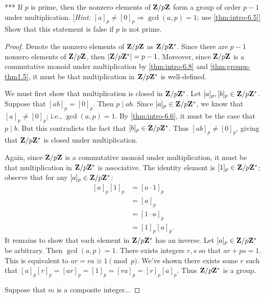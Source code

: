     \begin{exercise}{\color{red} ***}
        If $p$ is prime, then the nonzero elements of $\mathbf{Z}/p\mathbf{Z}$ form a group of order $p-1$ under multiplication. [\textit{Hint:} $[a]_{p} \neq [0]_p \Rightarrow \gcd(a,p) = 1$; use \ref{thm:intro-6.5}] Show that this statement is false if $p$ is not prime.
    \end{exercise}
        {\color{blue} \begin{proof}
            Denote the nonzero elements of $\mathbf{Z}/p\mathbf{Z}$ as $\mathbf{Z}/p\mathbf{Z}^\ast$. Since there are $p-1$ nonzero elements of $\mathbf{Z}/p\mathbf{Z}$, then $|\mathbf{Z}/p\mathbf{Z}^\ast| = p-1$. Moreover, since $\mathbf{Z}/p\mathbf{Z}$ is a commutative monoid under multiplication by \ref{thm:intro-6.8} and \ref{thm:groups-thm1.5}, it must be that multiplication in $\mathbf{Z}/p\mathbf{Z}^\ast$ is well-defined.

            We must first show that multiplication is closed in $\mathbf{Z}/p\mathbf{Z}^\ast$. Let $[a]_p,[b]_p \in \mathbf{Z}/p\mathbf{Z}^\ast$. Suppose that $[ab]_p = [0]_p$. Then $p \mid ab$. Since $[a]_p \in \mathbf{Z}/p\mathbf{Z}^\ast$, we know that $[a]_p \neq [0]_p$; i.e., $\gcd(a,p) = 1$. By \ref{thm:intro-6.6}, it must be the case that $p \mid b$. But this contradicts the fact that $[b]_p \in \mathbf{Z}/p\mathbf{Z}^\ast$. Thus $[ab]_p \neq [0]_p$, giving that $\mathbf{Z}/p\mathbf{Z}^\ast$ is closed under multiplication.

            Again, since $\mathbf{Z}/p\mathbf{Z}$ is a commutative monoid under multiplication, it must be that multiplication in $\mathbf{Z}/p\mathbf{Z}^\ast$ is associative. The identity element is $[1]_p \in \mathbf{Z}/p\mathbf{Z}^\ast$; observe that for any $[a]_p \in \mathbf{Z}/p\mathbf{Z}^\ast$:
                \begin{equation*}
                \begin{split}
                    [a]_p [1]_p
                    & = [a\cdot1]_p \\
                    & = [a]_p \\
                    & = [1 \cdot a]_p \\
                    & = [1]_p [a]_p.
                \end{split}
                \end{equation*}
            It remains to show that each element in $\mathbf{Z}/p\mathbf{Z}^\ast$ has an inverse. Let $[a]_p \in \mathbf{Z}/p\mathbf{Z}^\ast$ be arbitrary. Then $\gcd(a,p) = 1$. There exists integers $r,s$ so that $ar + ps = 1$. This is equivalent to $ar = ra \equiv 1 \pmod{p}$. We've shown there exists some $r$ such that $[a]_p[r]_p = [ar]_p = [1]_p = [ra]_p = [r]_p[a]_p$. Thus $\mathbf{Z}/p\mathbf{Z}^\ast$ is a group.

            Suppose that $m$ is a composite integer...
        \end{proof}}
    
